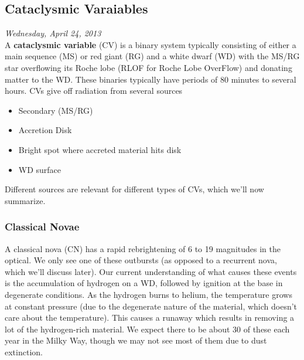 \documentclass[10pt]{article}
\numberwithin{equation}{section}
\newcommand{\n}{\noindent}
\begin{document}
	\subsection{Cataclysmic Varaiables} %
	\label{sub:cataclysmic_varaiables}
	\emph{Wednesday, April 24, 2013}\\
	
	\n A \textbf{cataclysmic variable} (CV) is a binary system typically consisting of either a main sequence (MS) or red giant (RG) and a white dwarf (WD) with the MS/RG star overflowing its Roche lobe (RLOF for Roche Lobe OverFlow) and donating matter to the WD. These binaries typically have periods of 80 minutes to several hours. CVs give off radiation from several sources
	\begin{itemize}
		\item Secondary (MS/RG)
		\item Accretion Disk
		\item Bright spot where accreted material hits disk
		\item WD surface
	\end{itemize}
	Different sources are relevant for different types of CVs, which we'll now summarize.
	
	\subsubsection{Classical Novae} %
	\label{ssub:classical_novae}
	A classical nova (CN) has a rapid rebrightening of 6 to 19 magnitudes in the optical. We only see one of these outbursts (as opposed to a recurrent nova, which we'll discuss later). Our current understanding of what causes these events is the accumulation of hydrogen on a WD, followed by ignition at the base in degenerate conditions. As the hydrogen burns to helium, the temperature grows at constant pressure (due to the degenerate nature of the material, which doesn't care about the temperature). This causes a runaway which results in removing a lot of the hydrogen-rich material. We expect there to be about 30 of these each year in the Milky Way, though we may not see most of them due to dust extinction.\\
	
\end{document}
